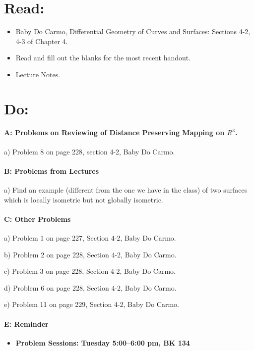 \documentclass[12pt]{article}
\title{\rightline {\Huge {Due:  November 20}}}
\author{\LARGE {HMC\quad Math 142 \quad Fall 2023} 
\\ {Prof. Gu}  
\\ {\LARGE Problem Set 9}}
\date{Start this assignment early!}
\begin{document}
\maketitle

\section*{ Read: } 

\begin{itemize}
\item{Baby Do Carmo, Differential Geometry
    of Curves and Surfaces:  
Sections 4-2, 4-3 of Chapter 4.}
\item{ Read and fill out the blanks for the most recent handout. }
\item{Lecture Notes.}
\end{itemize}

\section*{ Do: }
\paragraph{A: Problems on Reviewing of Distance Preserving Mapping on 
$R^3$. }
\begin{itemize}
{\item a) Problem 8 on page 228, section 4-2, Baby Do Carmo.} 
\end{itemize}

\medskip
\paragraph{B: Problems from Lectures}

\begin{itemize}
{\item a) Find an example (different from the one we have in the
  class) of two surfaces which is locally isometric
  but not globally isometric.} 
\end{itemize}

\paragraph{C: Other Problems}
\begin{itemize}

{\item a) Problem 1 on page 227, Section 4-2, Baby Do Carmo.}
{\item b) Problem 2 on page 228, Section 4-2, Baby Do Carmo.}
{\item c) Problem 3 on page 228,  Section 4-2, Baby Do Carmo.}
{\item d) Problem 6 on page 228,  Section 4-2, Baby Do Carmo.}
{\item e) Problem 11 on page 229,  Section 4-2, Baby Do Carmo.}
\end{itemize}


\paragraph{E: Reminder}
\begin{itemize}
\item{\bf Problem Sessions: Tuesday 5:00--6:00 pm, BK 134}
\end{itemize}
\end{document}
